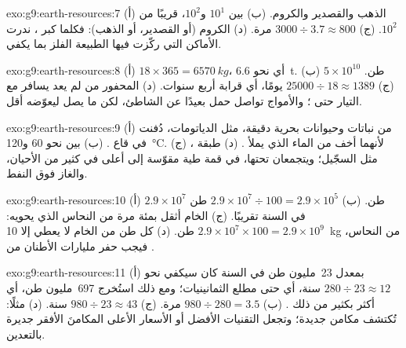 \begin{solution}{exo:g9:earth-resources:7}
(أ) الذهب والقصدير والكروم. (ب) بين $10^1$ و$10^2$، قريبًا من
$10^2$. (ج) $3000 \div 3.7 \approx 800$ مرة. (د) الكروم (أو القصدير، أو
الذهب): فكلما كبر ، ندرت الأماكن التي ركّزت فيها الطبيعة
الفلز بما يكفي.
\end{solution}

\begin{solution}{exo:g9:earth-resources:8}
(أ) $18 \times 365 = \qty{6570}{kg}$، أي نحو \qty{6.6}{t}. (ب) $5 \times
10^{10}$ طن. (ج) $25000 \div 18 \approx 1389$ يومًا، أي قرابة أربع سنوات.
(د)  المحفور من  لم يعد يسافر مع التيار حتى ؛ والأمواج
تواصل حمل  بعيدًا عن الشاطئ، لكن ما يصل ليعوّضه
أقل.
\end{solution}

\begin{solution}{exo:g9:earth-resources:9}
(أ) من نباتات وحيوانات بحرية دقيقة، مثل الدياتومات، دُفنت في  قاع
. (ب) بين نحو 60 و\qty{120}{\degreeCelsius}.
(ج) لأنهما أخف من الماء الذي يملأ  .
(د) طبقة ، مثل السجّيل؛ ويتجمعان تحتها، في قمة طية مقوّسة إلى
أعلى في كثير من الأحيان، والغاز فوق النفط.
\end{solution}

\begin{solution}{exo:g9:earth-resources:10}
(أ) $2.9 \times 10^7$ طن. (ب) $2.9 \times 10^7 \div 100 = 2.9 \times
10^5$ طن في السنة تقريبًا. (ج) الخام أثقل بمئة مرة من النحاس الذي
يحويه: $2.9 \times 10^7 \times 100 = 2.9 \times 10^9$ طن.
(د) كل طن من الخام لا يعطي إلا \qty{10}{kg} من النحاس، فيجب حفر
مليارات الأطنان من .
\end{solution}

\begin{solution}{exo:g9:earth-resources:11}
(أ) بمعدل 23~مليون طن في السنة كان سيكفي نحو $280 \div 23
\approx 12$ سنة، أي حتى مطلع الثمانينيات؛ ومع ذلك استُخرج 697~مليون طن،
أي أكثر بكثير من ذلك . (ب) $980 \div 280 = 3.5$ مرة. (ج) $980 \div
23 \approx 43$ سنة. (د) مثلًا: تُكتشف مكامن جديدة؛ وتجعل التقنيات
الأفضل أو الأسعار الأعلى المكامنَ الأفقر جديرة بالتعدين.
\end{solution}

